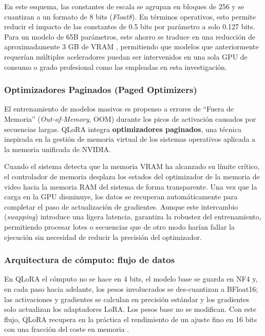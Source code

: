 \documentclass[12pt,a4paper]{report}
\begin{document}
En este esquema, las constantes de escala se agrupan en bloques de 256 y se cuantizan a un formato de 8 bits (\textit{Float8}). En términos operativos, 
esto permite reducir el impacto de las constantes de 0.5 bits por parámetro a solo 0.127 bits. Para un modelo de 65B parámetros, este ahorro se traduce en 
una reducción de aproximadamente 3 GB de VRAM \cite{dettmers_qlora_2023}, permitiendo que modelos que anteriormente requerían 
múltiples aceleradores puedan ser intervenidos en una sola GPU de consumo o grado profesional como las empleadas en esta investigación.

\subsubsection{Optimizadores Paginados (Paged Optimizers)}
\label{subsubsec:paged_opt}

El entrenamiento de modelos masivos es propenso a errores de ``Fuera de Memoria'' (\textit{Out-of-Memory}, OOM) durante los picos de activación causados por secuencias largas. 
QLoRA integra \textbf{optimizadores paginados}, una técnica inspirada en la gestión de memoria virtual de los sistemas operativos aplicada a la memoria unificada de NVIDIA.

Cuando el sistema detecta que la memoria VRAM ha alcanzado su límite crítico, el controlador de memoria desplaza los estados del optimizador de 
la memoria de video hacia la memoria RAM del sistema de forma transparente. Una vez que la carga en la GPU disminuye, los datos se recuperan automáticamente para completar 
el paso de actualización de gradientes. Aunque este intercambio (\textit{swapping}) introduce una ligera latencia, garantiza la robustez del entrenamiento, permitiendo procesar 
lotes o secuencias que de otro modo harían fallar la ejecución sin necesidad de reducir la precisión del optimizador.

\subsubsection{Arquitectura de cómputo: flujo de datos}
\label{subsubsec:qlora_workflow}

En QLoRA el cómputo no se hace en 4 bits, el modelo base se guarda en NF4 y, en cada paso hacia adelante, los pesos involucrados se des-cuantizan a BFloat16; 
las activaciones y gradientes se calculan en precisión estándar y los gradientes solo actualizan los adaptadores LoRA. Los pesos base no se modifican. 
Con este flujo, QLoRA recupera en la práctica el rendimiento de un ajuste fino en 16 bits con una fracción del coste en memoria \cite{dettmers_qlora_2023}.
\end{document}
